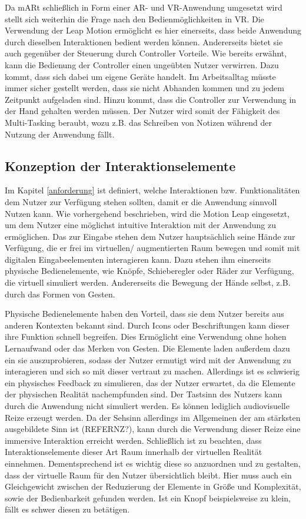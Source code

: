 Da mARt schließlich in Form einer AR- und VR-Anwendung umgesetzt wird stellt sich weiterhin die Frage nach den Bedienmöglichkeiten in VR. Die Verwendung der Leap Motion ermöglicht es hier einerseits, dass beide Anwendung durch dieselben Interaktionen bedient werden können. Andererseits bietet sie auch gegenüber der Steuerung durch Controller Vorteile. 
Wie bereits erwähnt, kann die Bedienung der Controller einen ungeübten Nutzer verwirren. Dazu kommt, dass sich dabei um eigene Geräte handelt. Im Arbeitsalltag müsste immer sicher gestellt werden, dass sie nicht Abhanden kommen und zu jedem Zeitpunkt aufgeladen sind. 
Hinzu kommt, dass die Controller zur Verwendung in der Hand gehalten werden müssen. Der Nutzer wird somit der Fähigkeit des Multi-Tasking beraubt, wozu z.B. das Schreiben von Notizen während der Nutzung der Anwendung fällt. 

\subsection{Konzeption der Interaktionselemente}

Im Kapitel \ref{anforderung} ist definiert, welche Interaktionen bzw. Funktionalitäten dem Nutzer zur Verfügung stehen sollten, damit er die Anwendung sinnvoll Nutzen kann. 
Wie vorhergehend beschrieben, wird die Motion Leap eingesetzt, um dem Nutzer eine möglichst intuitive Interaktion mit der Anwendung zu ermöglichen. Das zur Eingabe stehen dem Nutzer hauptsächlich seine Hände zur Verfügung, die er frei im virtuellen/ augmentierten Raum bewegen und somit mit digitalen Eingabeelementen interagieren kann. 
Dazu stehen ihm einerseits physische Bedienelemente, wie Knöpfe, Schieberegler oder Räder zur Verfügung, die virtuell simuliert werden. Andererseits die Bewegung der Hände selbst, z.B. durch das Formen von Gesten.

Physische Bedienelemente haben den Vorteil, dass sie dem Nutzer bereits aus anderen Kontexten bekannt sind. Durch Icons oder Beschriftungen kann dieser ihre Funktion schnell begreifen. Dies Ermöglicht eine Verwendung ohne hohen Lernaufwand oder das Merken von Gesten. 
Die Elemente laden außerdem dazu ein sie auszuprobieren, sodass der Nutzer ermutigt wird mit der Anwendung zu interagieren und sich so mit dieser vertraut zu machen. 
Allerdings ist es schwierig ein physisches Feedback zu simulieren, das der Nutzer erwartet, da die Elemente der physischen Realität nachempfunden sind. Der Tastsinn des Nutzers kann durch die Anwendung nicht simuliert werden. Es können lediglich audiovisuelle Reize erzeugt werden. Da der Sehsinn allerdings im Allgemeinen der am stärksten ausgebildete Sinn ist (REFERNZ?), kann durch die Verwendung dieser Reize eine immersive Interaktion erreicht werden. 
Schließlich ist zu beachten, dass Interaktionselemente dieser Art Raum innerhalb der virtuellen Realität einnehmen. Dementsprechend ist es wichtig diese so anzuordnen und zu gestalten, dass der virtuelle Raum für den Nutzer übersichtlich bleibt. Hier muss auch ein Gleichgewicht zwischen der Reduzierung der Elemente in Größe und Komplexität, sowie der Bedienbarkeit gefunden werden. Ist ein Knopf beispielsweise zu klein, fällt es schwer diesen zu betätigen. 

